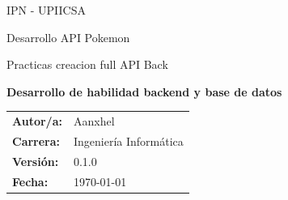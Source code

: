 \documentclass[12pt, a4paper]{article}
\newcommand{\Institucion}{IPN - UPIICSA}
\newcommand{\Materia}{Desarrollo API Pokemon}
\newcommand{\TituloPractica}{Practicas creacion full API Back}
\newcommand{\SubtituloPractica}{Desarrollo de habilidad backend y base de datos}
\newcommand{\Autor}{Aanxhel}
\newcommand{\Matricula}{101010}
\newcommand{\Carrera}{Ingeniería Informática}
\newcommand{\Profesor}{por asignar}
\newcommand{\SwVersion}{0.1.0}
\newcommand{\Fecha}{\today}
\begin{document}
\thispagestyle{empty}
\begin{center}
    \vspace*{1cm}
    {\large \Institucion \par}
    \vspace{0.3cm}
    {\large \Materia \par}

    \vfill
    {\Large \TituloPractica \par}
    \vspace{0.5cm}
    {\large \bfseries \SubtituloPractica \par}
    \vfill

    \begin{tabular}{@{}ll@{}}
      \textbf{Autor/a:} & \Autor \\
      \textbf{Carrera:} & \Carrera \\
      \textbf{Versión:} & \SwVersion \\
      \textbf{Fecha:} & \Fecha
    \end{tabular}
\end{center}
\clearpage







\end{document}

